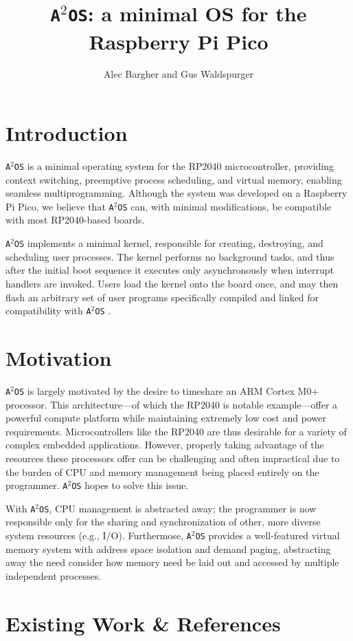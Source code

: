 \documentclass[12pt]{article}
\title{\texttt{A$^2$OS}: a minimal OS for the Raspberry Pi Pico}
\author{Alec Bargher and Gus Waldspurger}
\date{}
\newcommand{\os}{\texttt{A$^2$OS} }
\newcommand{\osns}{\texttt{A$^2$OS}}
\begin{document}
\maketitle

\section{Introduction}
\os is a minimal operating system for the RP2040 microcontroller, providing
context switching, preemptive process scheduling, and virtual memory, enabling
seamless multiprogramming. Although the system was developed on a Raspberry Pi
Pico, we believe that \os can, with minimal modifications, be compatible with
most RP2040-based boards.

\vspace{.5em}

\os implements a minimal kernel, responsible for creating, destroying, and
scheduling user processes. The kernel performs no background tasks, and thus
after the initial boot sequence it executes only asynchronously when interrupt
handlers are invoked. Users load the kernel onto the board once, and may then
flash an arbitrary set of user programs specifically compiled and linked for
compatibility with \os.

\section{Motivation}

\os is largely motivated by the desire to timeshare an ARM Cortex M0+ processor.
This architecture---of which the RP2040 is notable example---offer a powerful
compute platform while maintaining extremely low cost and power requirements.
Microcontrollers like the RP2040 are thus desirable for a variety of complex
embedded applications. However, properly taking advantage of the resources these
processors offer can be challenging and often impractical due to the burden of
CPU and memory management being placed entirely on the programmer. \os hopes to
solve this issue.

With \osns, CPU management is abstracted away; the programmer is now responsible
only for the sharing and synchronization of other, more diverse system
resources (e.g., I/O). Furthermose, \os provides a well-featured virtual memory
system with address space isolation and demand paging, abstracting away the need
consider how memory need be laid out and accessed by multiple independent
processes.

\section{Existing Work \& References}
\end{document}
